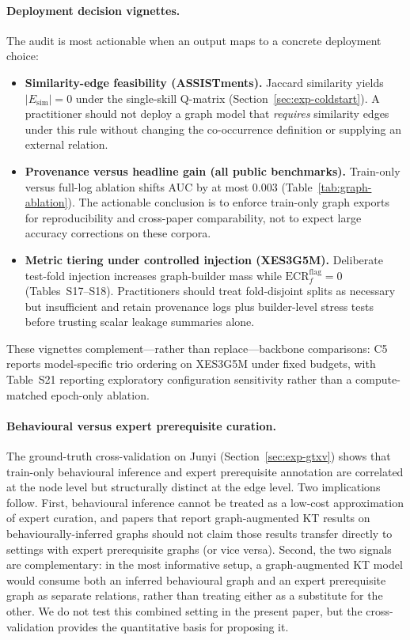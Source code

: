 \documentclass[pdflatex,sn-mathphys-num]{sn-jnl}
\begin{document}
\paragraph{Deployment decision vignettes.}
The audit is most actionable when an output maps to a concrete deployment
choice:
\begin{itemize}
  \item \textbf{Similarity-edge feasibility (ASSISTments).} Jaccard similarity
  yields $|E_{\mathrm{sim}}|{=}0$ under the single-skill Q-matrix
  (Section~\ref{sec:exp-coldstart}). A practitioner should not deploy a
  graph model that \emph{requires} similarity edges under this rule without
  changing the co-occurrence definition or supplying an external relation.
  \item \textbf{Provenance versus headline gain (all public benchmarks).}
  Train-only versus full-log ablation shifts AUC by at most $0.003$
  (Table~\ref{tab:graph-ablation}). The actionable conclusion is to enforce
  train-only graph exports for reproducibility and cross-paper comparability,
  not to expect large accuracy corrections on these corpora.
  \item \textbf{Metric tiering under controlled injection (XES3G5M).}
  Deliberate test-fold injection increases graph-builder mass while
  $\mathrm{ECR}^{\mathrm{flag}}_f{=}0$ (Tables~S17--S18). Practitioners
  should treat fold-disjoint splits as necessary but insufficient and retain
  provenance logs plus builder-level stress tests before trusting scalar
  leakage summaries alone.
\end{itemize}
These vignettes complement---rather than replace---backbone comparisons: C5
reports model-specific trio ordering on XES3G5M under fixed budgets, with
Table~S21 reporting exploratory configuration sensitivity rather than a
compute-matched epoch-only ablation.

\paragraph{Behavioural versus expert prerequisite curation.}
The ground-truth cross-validation on Junyi
(Section~\ref{sec:exp-gtxv}) shows that train-only behavioural
inference and expert prerequisite annotation are correlated at the
node level but structurally distinct at the edge level. Two
implications follow. First, behavioural inference cannot be treated
as a low-cost approximation of expert curation, and papers that
report graph-augmented KT results on behaviourally-inferred graphs
should not claim those results transfer directly to settings with
expert prerequisite graphs (or vice versa). Second, the two signals
are complementary: in the most informative setup, a graph-augmented
KT model would consume both an inferred behavioural graph and an
expert prerequisite graph as separate relations, rather than treating
either as a substitute for the other. We do not test this combined
setting in the present paper, but the cross-validation provides the
quantitative basis for proposing it.
\end{document}
